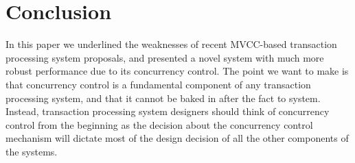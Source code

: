 
\section{Conclusion}

In this paper we underlined the weaknesses of recent MVCC-based transaction processing system proposals, and presented a novel system with much more robust performance due to its concurrency control.
The point we want to make is that concurrency control is a fundamental component of any transaction processing system, and that it cannot be baked in after the fact to system. Instead, transaction processing system designers should think of concurrency control from the beginning as the decision about the concurrency control mechanism will dictate most of the design decision of all the other components of the systems. 

